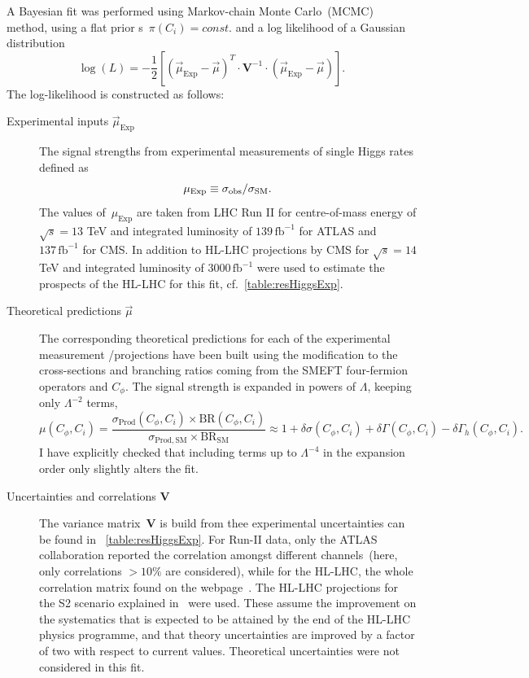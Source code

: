 	
	A Bayesian fit was performed using Markov-chain Monte Carlo~(MCMC) method, using a flat prior s~$ \pi(C_i)= const.$ and a log likelihood of a Gaussian distribution 
	\begin{equation}
		\log(L) = -\frac{1}{2}\left[  (\vec{\mu}_{\mathrm{Exp}} -\vec{\mu} ) ^{T} \cdot \mathbf{V}^{-1} \cdot ( \vec{\mu}_{\mathrm{Exp}} -\vec{\mu} )\right]  .
		\label{eq:loglike}
	\end{equation}
	The log-likelihood is constructed as follows:
	\begin{description}
		\item[Experimental inputs $\vec{\mu}_{\mathrm{Exp}}$ ] The signal strengths from experimental measurements of single Higgs rates defined as
		\begin{equation}
			\mu_{\mathrm{Exp}}\equiv \sigma_{\mathrm{obs}}/\sigma_{\mathrm{SM}}.
		\end{equation}
		The values of~$	\mu_{\mathrm{Exp}}$ are taken from LHC Run II for centre-of-mass energy of $\sqrt{s} = 13$ TeV and  integrated luminosity of $ 139\, \mathrm{fb}^{-1}$ for ATLAS and  $ 137\,\mathrm{fb}^{-1}$ for CMS. In addition to HL-LHC projections by CMS for $\sqrt{s} = 14$ TeV and integrated luminosity of $ 3000\, \mathrm{fb}^{-1}$ were used to estimate the prospects of the HL-LHC for this fit, cf.~\autoref{table:resHiggsExp}.
		\item [Theoretical predictions $\vec{\mu}$ ]  The corresponding theoretical predictions for each of the experimental measurement /projections have been built using the modification to the cross-sections and branching ratios coming from the SMEFT four-fermion operators and $C_\phi$. The signal strength is expanded in powers of $\Lambda$, keeping only $ \Lambda^{-2}$ terms,
		\begin{equation}
			\mu(C_\phi,C_i)=\frac{\sigma_\mathrm{ Prod}(C_\phi,C_i) \times \mathrm{ BR}(C_\phi,C_i)}{\sigma_\mathrm{ Prod, SM}\times \mathrm{BR}_\mathrm{ SM}} \approx 1+\delta \sigma(C_\phi,C_i)+\delta\Gamma(C_\phi,C_i)-\delta \Gamma_h(C_\phi,C_i).
			\label{linear-mu}
		\end{equation}
	I have explicitly checked that including terms up to $\Lambda^{-4}$ in the expansion order only slightly alters the fit.
		\item [Uncertainties and correlations $\mathbf{V}$ ]  The variance matrix~$\mathbf{V}$ is build from thee experimental uncertainties can be found in ~\autoref{table:resHiggsExp}. For Run-II data, only the ATLAS collaboration reported the correlation amongst different channels~(here, only correlations $> 10\%$ are considered), while for the HL-LHC, the whole correlation matrix found on the webpage~\cite{twiki}.  The HL-LHC projections for the S2 scenario explained in~\cite{Cepeda:2019klc} were used. These assume the improvement on the systematics that is expected to be attained by the end of the HL-LHC physics programme, and that theory uncertainties are improved by a factor of two with respect to current values. Theoretical uncertainties were not considered in this fit.
	\end{description}

